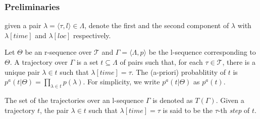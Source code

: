 \begin{frame}
\begin{columns}
\end{columns}

\end{frame}


\begin{frame}
\frametitle{Preliminaries}

given a pair $\lambda = \langle \tau, l \rangle \in \Lambda$, denote the first and the second component of $\lambda$ with $\lambda[time]$ and $\lambda[loc]$ respectively.

\begin{definition}[Trajectory]
  Let $\Theta$ be an r-sequence over $\mathcal{T}$ and $\Gamma = \langle \Lambda,p \rangle$ be the l-sequence corresponding to $\Theta$. A trajectory over $\Gamma$ is a set $t \subseteq \Lambda$ of pairs such that, for each $\tau \in \mathcal{T}$, there is a unique pair $\lambda \in t$ such that $\lambda[time] = \tau$. The (a-priori) probablitity of $t$ is $p^a(t|\Theta) = \prod_{\lambda \in t}p(\lambda)$. For simplicity, we write $p^a(t|\Theta)$ as $p^a(t)$.
\end{definition}

The set of the trajectories over an l-sequence $\Gamma$ is denoted as $T(\Gamma)$. Given a trajectory $t$, the pair $\lambda \in t$ such that $\lambda[time] = \tau$ is said to be the $\tau$-th \emph{step} of $t$.

\end{frame}


